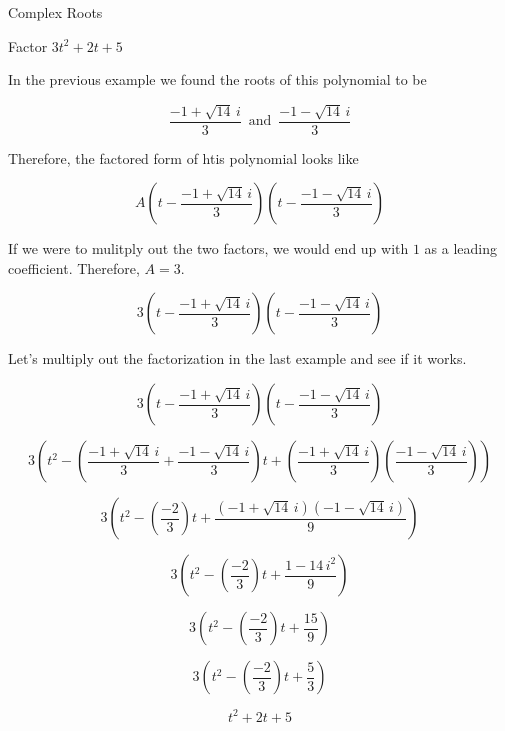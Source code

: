 \documentclass{ximera}
\begin{document}
\begin{example} Complex Roots

Factor $3 t^2 + 2 t + 5$


In the previous example we found the roots of this polynomial to be


\[     \frac{-1 + \sqrt{14} \, i}{3}   \,  \text{ and } \, \frac{-1 - \sqrt{14} \, i}{3}         \]

Therefore, the factored form of htis polynomial looks like


\[     A \left(t - \frac{-1 + \sqrt{14} \, i}{3} \right) \left(t -  \frac{-1 - \sqrt{14} \, i}{3} \right)        \]


If we were to mulitply out the two factors, we would end up with $1$ as a leading coefficient.  Therefore, $A = 3$.

\[     3 \left(t - \frac{-1 + \sqrt{14} \, i}{3} \right) \left(t -  \frac{-1 - \sqrt{14} \, i}{3} \right)        \]

\end{example}





Let's multiply out the factorization in the last example and see if it works.



\[     3 \left(t - \frac{-1 + \sqrt{14} \, i}{3} \right) \left(t -  \frac{-1 - \sqrt{14} \, i}{3} \right)        \]


\[     3 \left(  t^2 - \left(\frac{-1 + \sqrt{14} \, i}{3} + \frac{-1 - \sqrt{14} \, i}{3}\right) t + \left(\frac{-1 + \sqrt{14} \, i}{3}\right) \left(\frac{-1 - \sqrt{14} \, i}{3}\right)      \right)       \]



\[     3 \left(  t^2 - \left(\frac{-2}{3} \right) t + \frac{(-1 + \sqrt{14} \, i)(-1 - \sqrt{14} \, i)}{9}\right)     \]



\[     3 \left(  t^2 - \left(\frac{-2}{3} \right) t + \frac{1 - 14 \, i^2}{9}\right)     \]


\[     3 \left(  t^2 - \left(\frac{-2}{3} \right) t + \frac{15}{9} \right)     \]


\[     3 \left(  t^2 - \left(\frac{-2}{3} \right) t + \frac{5}{3}\right)     \]



\[      t^2 + 2t + 5   \]
\end{document}
